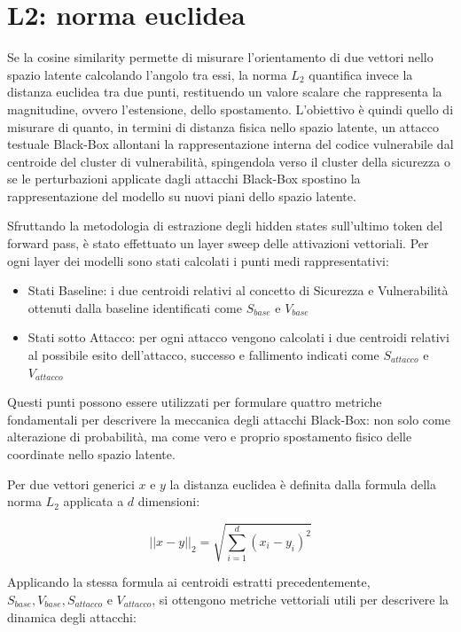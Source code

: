\section{L2: norma euclidea}
Se la cosine similarity permette di misurare l'orientamento di due vettori nello spazio latente calcolando l'angolo tra essi, la norma $L_2$ quantifica invece la distanza euclidea tra due punti, restituendo un valore scalare che rappresenta la magnitudine, ovvero l'estensione, dello spostamento.
L'obiettivo è quindi quello di misurare di quanto, in termini di distanza fisica nello spazio latente, un attacco testuale Black-Box allontani la rappresentazione interna del codice vulnerabile dal centroide del cluster di vulnerabilità, spingendola verso il cluster della sicurezza o se le perturbazioni applicate dagli attacchi Black-Box spostino la rappresentazione del modello su nuovi piani dello spazio latente.

Sfruttando la metodologia di estrazione degli hidden states sull'ultimo token del forward pass, è stato effettuato un layer sweep delle attivazioni vettoriali. Per ogni layer dei modelli sono stati calcolati i punti medi rappresentativi:
\begin{itemize}[noitemsep]
    \item Stati Baseline: i due centroidi relativi al concetto di Sicurezza e Vulnerabilità ottenuti dalla baseline identificati come $S_{base}$ e $V_{base}$
    \item Stati sotto Attacco: per ogni attacco vengono calcolati i due centroidi relativi al possibile esito dell'attacco, successo e fallimento indicati come $S_{attacco}$ e $V_{attacco}$
\end{itemize}

Questi punti possono essere utilizzati per formulare quattro metriche fondamentali per descrivere la meccanica degli attacchi Black-Box: non solo come alterazione di probabilità, ma come vero e proprio spostamento fisico delle coordinate nello spazio latente.

Per due vettori generici $x$ e $y$ la distanza euclidea è definita dalla formula della norma $L_2$ applicata a $d$ dimensioni:

\begin{equation}
    ||x-y||_2 = \sqrt{ \sum_{i=1}^d (x_i - y_i)^2}
\end{equation}

Applicando la stessa formula ai centroidi estratti precedentemente, $S_{base}, V_{base}, S_{attacco}$ e $V_{attacco}$, si ottengono metriche vettoriali utili per descrivere la dinamica degli attacchi:\\

